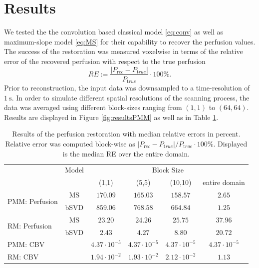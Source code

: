 \documentclass[paper=a4, fontsize=11pt,parskip=half,headings=small]{scrartcl}
\begin{document}
	

	\section{Results}\label{sec:results}

	We tested the the convolution based classical model \eqref{eq:conv} as well as maximum-slope model \eqref{eq:MS} for their capability to recover the perfusion values.
	The success of the restoration was measured voxelwise in terms of the relative error of the recovered perfusion with respect to the true perfusion
	\[
		RE := \frac{\vert P_{\mathrm rec} - P_{\mathrm true}\vert}{P_{\mathrm true}}\cdot 100\%.
	\]
	Prior to reconstruction, the input data was downsampled to a time-resolution of $\SI{1}{\second}$.
	In order to simulate different spatial resolutions of the scanning process, the data was averaged using different block-sizes ranging from $(1,1)$ to $(64,64)$.
	Results are displayed in Figure \ref{fig:resultsPMM} as well as in Table \ref{tab:resultsSim}.
	
	\begin{table}[H]
		\caption{Results of the perfusion restoration with median relative errors in percent. Relative error was computed block-wise as $\vert P_{\mathrm rec} - P_{\mathrm true}\vert / P_{\mathrm true}\cdot 100\%$. Displayed is the median RE over the entire domain.}
		\centering
		\begin{tabular}{l c c c c c }
			& Model & \multicolumn{4}{c}{Block Size}\\
			 					 			& 		& (1,1) 	& (5,5)		& (10,10)	& entire domain \\
			\toprule
			\multirow{2}{*}{PMM: Perfusion} & MS 	& $170.09$ 	& $165.03$ 	& $158.57$	& $2.65$ \\
			 					 	   		& bSVD  & $859.06$ 	& $768.58$ 	& $664.84$	& $1.25$ \\
			\multirow{2}{*}{RM: Perfusion} & MS 	& $23.20$ 	& $24.26$ 	& $25.75$ 	& $37.96$ \\
			 					 			& bSVD  & $2.43$ 	& $4.27$ 	& $8.80$ 	& $20.72$ \\
			\midrule											
			PMM: CBV & & $4.37\cdot10^{-5}$      & $4.37\cdot10^{-5}$		& $4.37\cdot10^{-5}$		& $4.37\cdot10^{-5}$ \\											
			RM:  CBV & & $1.94\cdot10^{-2}$      & $1.93\cdot10^{-2}$		& $2.12\cdot10^{-2}$		& $1.13$ 			
		\end{tabular}
		\label{tab:resultsSim}
	\end{table}
	
\end{document}

